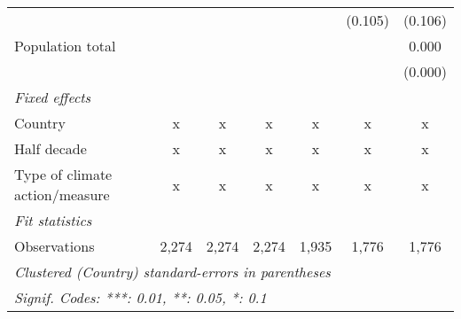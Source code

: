 \begin{tabular}{lcccccc}
                                             &               &         &         &         & (0.105) & (0.106)\\   
   Population total                          &               &         &         &         &         & 0.000\\   
                                             &               &         &         &         &         & (0.000)\\   
   \emph{Fixed effects}\\
   Country                                   & x             & x       & x       & x       & x       & x\\  
   Half decade                               & x             & x       & x       & x       & x       & x\\  
   Type of climate action/measure            & x             & x       & x       & x       & x       & x\\  
   \midrule \emph{Fit statistics}\\
   Observations                              & 2,274         & 2,274   & 2,274   & 1,935   & 1,776   & 1,776\\  
   \midrule
   \multicolumn{7}{l}{\emph{Clustered (Country) standard-errors in parentheses}}\\
   \multicolumn{7}{l}{\emph{Signif. Codes: ***: 0.01, **: 0.05, *: 0.1}}\\
\end{tabular}
\par\endgroup


